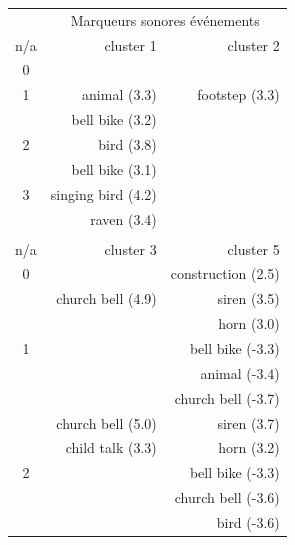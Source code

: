 \begin{table}[t]
\centering
\begin{tabular}{crr}
                      & \multicolumn{2}{c}{Marqueurs sonores événements}      \\ 
n/a                   &      cluster   1   & cluster      2   \\
\hline
0                     &                    &                  \\
\hline
1                     & animal  (3.3)      & footstep  (3.3)  \\
                      & bell bike (3.2)    &                  \\
\hline
2                     & bird (3.8)         &                  \\
                      & bell bike (3.1)    &                  \\                             
\hline
3                     & singing bird (4.2) &                  \\
                      & raven (3.4)        &                  \\                                               
\hline
                      &                    &                  \\ 
n/a                   &   cluster 3        & cluster 5  \\                      
\hline
0                     &                    & construction (2.5) \\
\hline
                      & church bell (4.9)  & siren (3.5) \\
                      &                    & horn  (3.0) \\
1                     &                    & bell bike  (-3.3) \\
                      &                    & animal (-3.4)  \\
                      &                    & church bell (-3.7) \\
\hline
                      & church bell (5.0)  & siren (3.7)  \\
                      & child talk  (3.3)  & horn  (3.2)\\        
2                     &                    & bell bike (-3.3) \\
                      &                    & church bell (-3.6) \\                        
                      &                    & bird (-3.6) \\                           

\end{tabular}
\end{table}
